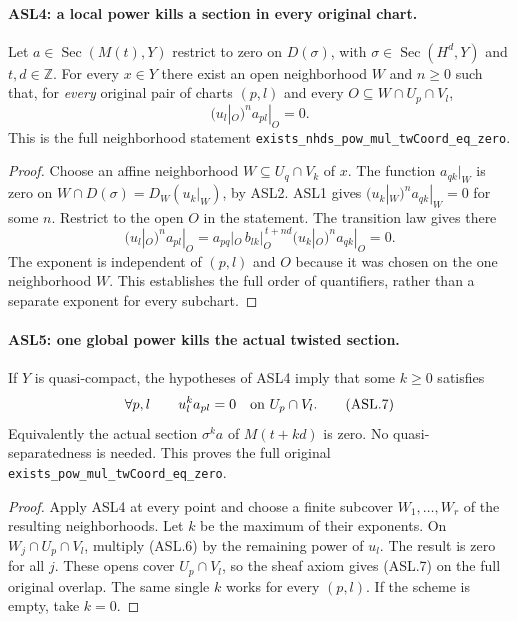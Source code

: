 \documentclass[11pt,a4paper]{article}
\numberwithin{equation}{section}
\theoremstyle{remark}\newtheorem{remark}[theorem]{Remark}
\begin{document}
\paragraph{ASL4: a local power kills a section in every original chart.}
\label{claim:ASL4}
Let $a\in\operatorname{Sec}(M(t),Y)$ restrict to zero on
$D(\sigma)$, with $\sigma\in\operatorname{Sec}(H^d,Y)$ and
$t,d\in\mathbb Z$.  For every $x\in Y$ there exist an open
neighborhood $W$ and $n\ge0$ such that, for \emph{every} original
pair of charts $(p,l)$ and every
$O\subseteq W\cap U_p\cap V_l$,
\[
                    (u_l|_O)^n a_{pl}|_O=0.          \tag{ASL.6}
\]
This is the full neighborhood statement
\texttt{exists\_\allowbreak{}nhds\_\allowbreak{}pow\_\allowbreak{}mul\_\allowbreak{}tw\allowbreak{}Coord\_\allowbreak{}eq\_\allowbreak{}zero}.

\begin{proof}
Choose an affine neighborhood $W\subseteq U_q\cap V_k$ of $x$.
The function $a_{qk}|_W$ is zero on
$W\cap D(\sigma)=D_W(u_k|_W)$, by ASL2.  ASL1 gives
$(u_k|_W)^n a_{qk}|_W=0$ for some $n$.
Restrict to the open $O$ in the statement.  The transition law gives there
\[
 (u_l|_O)^n a_{pl}|_O
   =a_{pq}|_O\, b_{lk}|_O^{\,t+nd}
                           (u_k|_O)^n a_{qk}|_O=0.
\]
The exponent is independent of $(p,l)$ and $O$ because it was
chosen on the one neighborhood $W$.  This establishes the full
order of quantifiers, rather than a separate exponent for every
subchart.
\end{proof}

\paragraph{ASL5: one global power kills the actual twisted section.}
\label{claim:ASL5}
If $Y$ is quasi-compact, the hypotheses of ASL4 imply that some
$k\ge0$ satisfies
\[
 \forall p,l\qquad u_l^k a_{pl}=0
                 \quad\hbox{on }U_p\cap V_l.         \tag{ASL.7}
\]
Equivalently the actual section $\sigma^k a$ of $M(t+kd)$ is
zero.  No quasi-separatedness is needed.  This proves the full
original \texttt{exists\_\allowbreak{}pow\_\allowbreak{}mul\_\allowbreak{}tw\allowbreak{}Coord\_\allowbreak{}eq\_\allowbreak{}zero}.

\begin{proof}
Apply ASL4 at every point and choose a finite subcover
$W_1,\ldots,W_r$ of the resulting neighborhoods.  Let $k$ be
the maximum of their exponents.  On
$W_j\cap U_p\cap V_l$, multiply (ASL.6) by the remaining
power of $u_l$.  The result is zero for all $j$.
These opens cover $U_p\cap V_l$, so the sheaf axiom gives
(ASL.7) on the full original overlap.  The same single $k$
works for every $(p,l)$.  If the scheme is empty, take $k=0$.
\end{proof}
\end{document}
